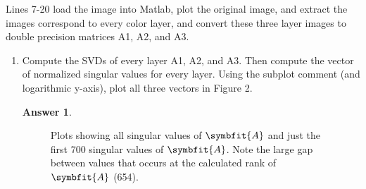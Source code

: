 \documentclass{article}
\theoremstyle{definition}
\newtheorem*{answer}{Answer}
\newcommand{\mat}[1]{\symbfit{#1}}
\begin{document}
\begin{enumerate}[leftmargin=\labelsep]
	      Lines 7-20 load the image into Matlab, plot the original image, and extract the images correspond to every color layer, and convert these three layer images to double precision matrices A1, A2, and A3.
	      \begin{enumerate}
		      \item Compute the SVDs of every layer A1, A2, and A3. Then compute the vector of normalized singular values for every layer. Using the subplot comment (and logarithmic y-axis), plot all three vectors in Figure 2.
		            \begin{answer}
			            \begin{figure}[H]
				            \centering{}
				            \caption{Plots showing all singular values of \(\mat{A}\) and just the first 700 singular values of \(\mat{A}\). Note the large gap between values that occurs at the calculated rank of \(\mat{A}\) (654).}\label{fig:singvals}
			            \end{figure}
		            \end{answer}


\end{enumerate}
\end{enumerate}
\end{document}
